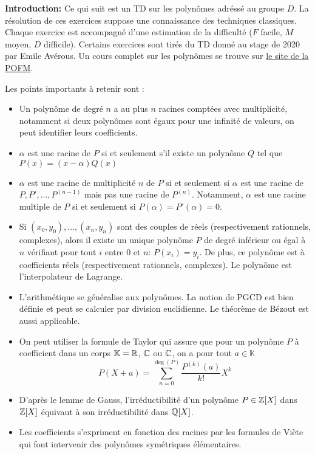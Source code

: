 \textbf{Introduction:} Ce qui suit est un TD sur les polynômes adréssé au groupe $D$. La résolution de ces exercices suppose une connaissance des techniques classiques. Chaque exercice est accompagné d'une estimation de la difficulté ($F$ facile, $M$ moyen, $D$ difficile). Certains exercices sont tirés du TD donné au stage de 2020 par Emile Avérous. Un cours complet sur les polynômes se trouve sur \href{https://maths-olympiques.fr/wp-content/uploads/2017/09/polynomes.pdf}{le site de la POFM}.

Les points importants à retenir sont :
\begin{itemize}
    \item Un polynôme de degré $n$ a au plus $n$ racines comptées avec multiplicité, notamment si deux polynômes sont égaux pour une infinité de valeurs, on peut identifier leurs coefficients.
    \item $\alpha$ est une racine de $P$ si et seulement s'il existe un polynôme $Q$ tel que $P(x)=(x-\alpha)Q(x)$
    \item $\alpha$ est une racine de multiplicité $n$ de $P$ si et seulement si $\alpha$ est une racine de $P,P',\ldots,P^{(n-1)}$ mais pas une racine de $P^{(n)}$. Notamment, $\alpha$ est une racine multiple de $P$ si et seulement si $P(\alpha)=P'(\alpha)=0$.
    \item Si $(x_0,y_0),\ldots,(x_n,y_n)$ sont des couples de réels (respectivement rationnels, complexes), alors il existe un unique polynôme $P$ de degré inférieur ou égal à $n$ vérifiant pour tout $i$ entre $0$ et $n$: $P(x_i)=y_i$. De plus, ce polynôme est à coefficients réels (respectivement rationnels, complexes). Le polynôme est l'interpolateur de Lagrange.
    \item L'arithmétique se généralise aux polynômes. La notion de PGCD est bien définie et peut se calculer par division euclidienne. Le théorème de Bézout est aussi applicable.
    \item On peut utiliser la formule de Taylor qui assure que pour un polynôme $P$ à coefficient dans un corps $\mathbb{K}=\mathbb R$, $\mathbb C$ ou $\mathbb C$, on a pour tout $a\in \mathbb{K}$
    $$P(X+a)=\sum_{n=0}^{\deg(P)}\frac{P^{(k)}(a)}{k!}X^k $$
    \item D'après le lemme de Gauss, l'irréductibilité d'un polynôme $P\in \mathbb Z[X]$ dans $\mathbb Z[X]$ équivaut à son irréductibilité dans $\mathbb Q[X]$.
    \item Les coefficients s'expriment en fonction des racines par les formules de Viète qui font intervenir des polynômes symétriques élémentaires.
\end{itemize}


